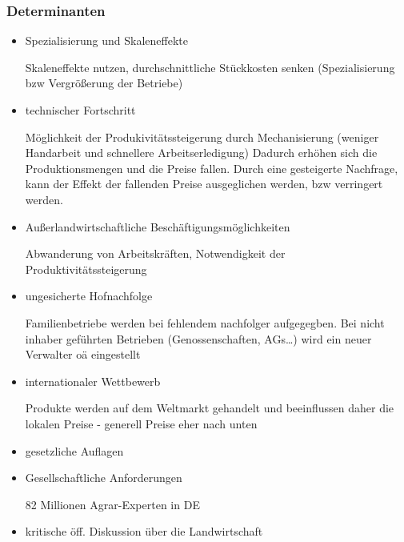 \documentclass[11pt]{article}
\begin{document}
\subsubsection{Determinanten}
\begin{itemize}
	\item{Spezialisierung und Skaleneffekte}

		Skaleneffekte nutzen, durchschnittliche Stückkosten senken (Spezialisierung bzw Vergrößerung der Betriebe)
	\item{technischer Fortschritt}

		Möglichkeit der Produkivitätssteigerung durch Mechanisierung (weniger Handarbeit und schnellere Arbeitserledigung)
		Dadurch erhöhen sich die Produktionsmengen und die Preise fallen. Durch eine gesteigerte Nachfrage, kann der Effekt der fallenden Preise ausgeglichen werden, bzw verringert werden.
	\item{Außerlandwirtschaftliche Beschäftigungsmöglichkeiten}

		Abwanderung von Arbeitskräften, Notwendigkeit der Produktivitätssteigerung
	\item{ungesicherte Hofnachfolge}

		Familienbetriebe werden bei fehlendem nachfolger aufgegegben. Bei nicht inhaber geführten Betrieben (Genossenschaften, AGs\ldots) wird ein neuer Verwalter oä eingestellt
	\item{internationaler Wettbewerb}

		Produkte werden auf dem Weltmarkt gehandelt und beeinflussen daher die lokalen Preise - generell Preise eher nach unten

	\item{gesetzliche Auflagen}

	\item{Gesellschaftliche Anforderungen}

		82 Millionen Agrar-Experten in DE
	\item{kritische öff. Diskussion über die Landwirtschaft}
\end{itemize}
\end{document}
